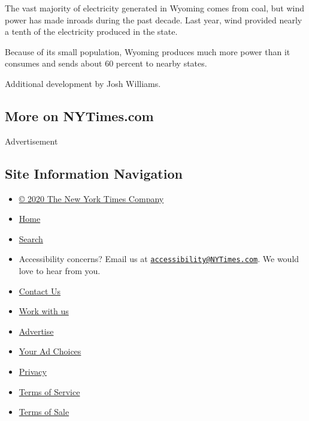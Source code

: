 The vast majority of electricity generated in Wyoming comes from coal,
but wind power has made inroads during the past decade. Last year, wind
provided nearly a tenth of the electricity produced in the state.

Because of its small population, Wyoming produces much more power than
it consumes and sends about 60 percent to nearby states.

Additional development by Josh Williams.

\hypertarget{more-on-nytimescom}{%
\subsection{More on NYTimes.com}\label{more-on-nytimescom}}

Advertisement

\hypertarget{site-information-navigation}{%
\subsection{Site Information
Navigation}\label{site-information-navigation}}

\begin{itemize}
\tightlist
\item
  \href{https://help.nytimes3xbfgragh.onion/hc/en-us/articles/115014792127-Copyright-notice}{©
  2020 The New York Times Company}
\item
  \href{https://www.nytimes3xbfgragh.onion}{Home}
\item
  \href{https://www.nytimes3xbfgragh.onion/search/}{Search}
\item
  Accessibility concerns? Email us at
  \href{mailto:accessibility@NYTimes.com}{\nolinkurl{accessibility@NYTimes.com}}.
  We would love to hear from you.
\item
  \href{https://help.nytimes3xbfgragh.onion/hc/en-us/articles/115015385887-Contact-Us}{Contact
  Us}
\item
  \href{https://www.nytco.com/careers/}{Work with us}
\item
  \href{https://nytmediakit.com/}{Advertise}
\item
  \href{https://help.nytimes3xbfgragh.onion/hc/en-us/articles/115014892108-Privacy-policy\#pp}{Your
  Ad Choices}
\item
  \href{https://help.nytimes3xbfgragh.onion/hc/en-us/articles/115014892108-Privacy-policy}{Privacy}
\item
  \href{https://help.nytimes3xbfgragh.onion/hc/en-us/articles/115014893428-Terms-of-service}{Terms
  of Service}
\item
  \href{https://help.nytimes3xbfgragh.onion/hc/en-us/articles/115014893968-Terms-of-sale}{Terms
  of Sale}
\end{itemize}

